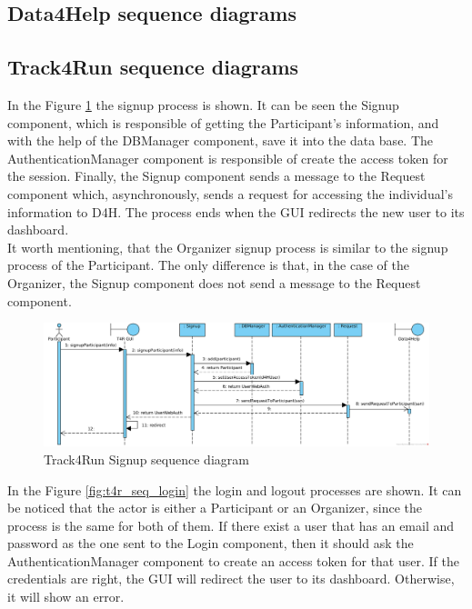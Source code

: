 \documentclass[a4paper, hidelinks, 12pt]{report}
\begin{document}
	\subsection{Data4Help sequence diagrams}
	
	\subsection{Track4Run sequence diagrams}
	
	In the Figure \ref{fig:t4r_seq_signup} the signup process is shown. It can be seen the Signup component, which is responsible of getting the Participant's information, and with the help of the DBManager component, save it into the data base. The AuthenticationManager component is responsible of create the access token for the session. Finally, the Signup component sends a message to the Request component which, asynchronously,  sends a request for accessing the individual's information to D4H. The process ends when the GUI redirects the new user to its dashboard.\\
	
	It worth mentioning, that the Organizer signup process is similar to the signup process of the Participant. The only difference is that, in the case of the Organizer, the Signup component does not send a message to the Request component.\\
	\begin{figure}[H]
		\centering
		\includegraphics[width=1\textwidth]{diagrams/sequence_diagrams/t4r_signup_participant.png}
		\caption[Track4Run Signup sequence diagram]{Track4Run Signup sequence diagram}
		\label{fig:t4r_seq_signup}
	\end{figure}
	
	In the Figure \ref{fig:t4r_seq_login} the login and logout processes are shown. It can be noticed that the actor is either a Participant or an Organizer, since the process is the same for both of them. If there exist a user that has an email and password as the one sent to the Login component, then it should ask the AuthenticationManager component to create an access token for that user. If the credentials are right, the GUI will redirect the user to its dashboard. Otherwise, it will show an error.\\
	
\end{document}
